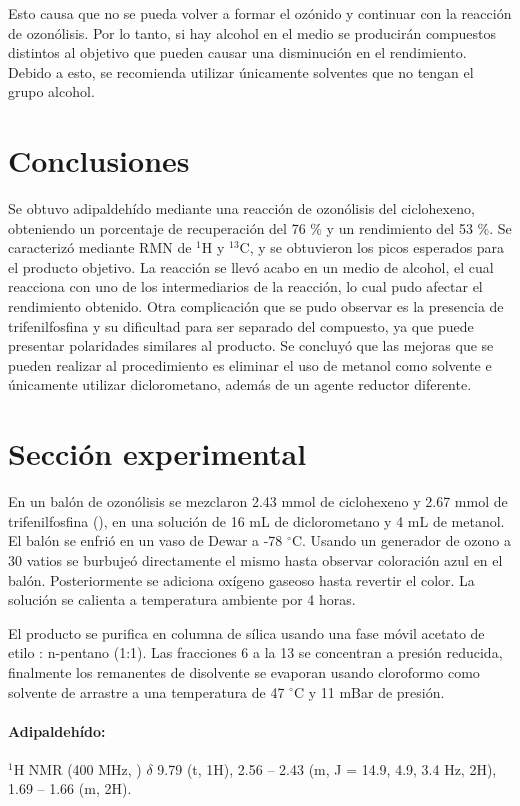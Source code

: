 \documentclass[fleqn,10pt]{SelfArx}
\begin{document}
Esto causa que no se pueda volver a formar el ozónido y continuar con la reacción de ozonólisis\cite{Carey2007}. Por lo tanto, si hay alcohol en el medio se producirán compuestos distintos al objetivo que pueden causar una disminución en el rendimiento. Debido a esto, se recomienda utilizar únicamente solventes que no tengan el grupo alcohol.

\newpage
\section{Conclusiones}
Se obtuvo adipaldehído mediante una reacción de ozonólisis del ciclohexeno, obteniendo un porcentaje de recuperación del 76 \% y un rendimiento del 53 \%. Se caracterizó mediante RMN de $^1$H y $^{13}$C, y se obtuvieron los picos esperados para el producto objetivo. La reacción se llevó acabo en un medio de alcohol, el cual reacciona con uno de los intermediarios de la reacción, lo cual pudo afectar el rendimiento obtenido. Otra complicación que se pudo observar es la presencia de trifenilfosfina y su dificultad para ser separado del compuesto, ya que puede presentar polaridades similares al producto. Se concluyó que las mejoras que se pueden realizar al procedimiento es eliminar el uso de metanol como solvente e únicamente utilizar diclorometano, adem\'as de un agente reductor diferente.

\section{Secci\'on experimental}
En un bal\'on de ozon\'olisis se mezclaron 2.43 mmol de ciclohexeno y 2.67 mmol de trifenilfosfina (), en una soluci\'on de 16 mL de diclorometano y 4 mL de metanol. El bal\'on se enfri\'o en un vaso de Dewar a -78 $^\circ$C. Usando un generador de ozono a 30 vatios se burbuje\'o directamente el mismo hasta observar coloraci\'on azul en el bal\'on. Posteriormente se adiciona ox\'igeno gaseoso hasta revertir el color. La soluci\'on se calienta a temperatura ambiente por 4 horas. 

El producto se purifica en columna de s\'ilica usando una fase m\'ovil acetato de etilo : n-pentano (1:1). Las fracciones 6 a la 13 se concentran a presi\'on reducida, finalmente los remanentes de disolvente se evaporan usando cloroformo como solvente de arrastre a una temperatura de 47 $^\circ$C y 11 mBar de presi\'on.

\paragraph{Adipaldeh\'ido:}
$^1$H NMR (400 MHz, ) $\delta$ 9.79 (t, 1H), 2.56 – 2.43 (m, J = 14.9, 4.9, 3.4 Hz, 2H), 1.69 – 1.66 (m, 2H).
\end{document}
